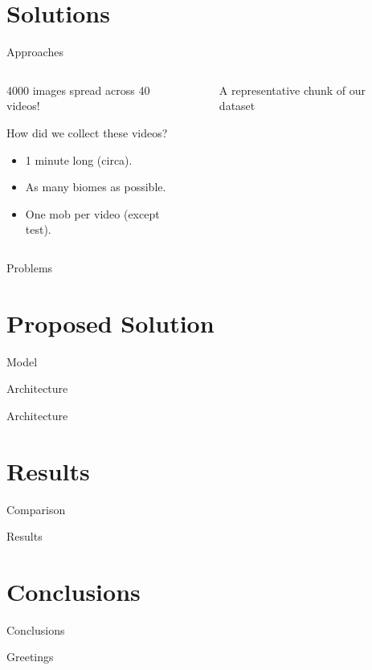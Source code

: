 \documentclass[english]{beamer}
\begin{document}
\section{Solutions}
\begin{frame}{Approaches}
  \begin{columns}
    \begin{column}{0.5\textwidth}
      4000 images spread across 40 videos!

      How did we collect these videos?
      \begin{itemize}
        \item 1 minute long (circa).
        \item As many biomes as possible.
        \item One mob per video (except test).
      \end{itemize}
    \end{column}

    \begin{column}{0.5\textwidth}
      \begin{figure}[h]
          \centering
          \caption{A representative chunk of our dataset}
      \end{figure}
    \end{column}

  \end{columns}
\end{frame}

\begin{frame}{Problems}

\end{frame}
\section{Proposed Solution}
\begin{frame}{Model}
  
\end{frame}
\begin{frame}{Architecture}
  
\end{frame}
\begin{frame}{Architecture}
  
\end{frame}

\section{Results}
\begin{frame}{Comparison}

\end{frame}

\begin{frame}{Results}

\end{frame}

\section{Conclusions}
\begin{frame}{Conclusions}

\end{frame}

\begin{frame}{Greetings}

\end{frame}
\end{document}
